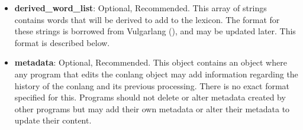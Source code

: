 \begin{itemize}
	\item \textbf{derived\_word\_list}: Optional, Recommended.  This array of strings contains words that will be derived to add to the lexicon.  The format for these strings is borrowed from Vulgarlang (\cite{camfromvulgarlangVulgarlangFantasyLanguage}), and may be updated later.  This format is described below.
	\item \textbf{metadata}: Optional, Recommended. This object contains an object where any program that edits the conlang object may add information regarding the history of the conlang and its previous processing.  There is no exact format specified for this.  Programs should not delete or alter metadata created by other programs but may add their own metadata or alter their metadata to update their content.  
\end{itemize}